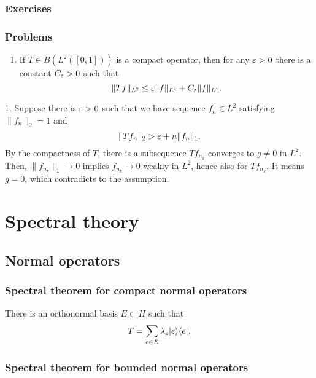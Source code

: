 \documentclass{../note}
\begin{document}
\section*{Exercises}

\section*{Problems}
\begin{enumerate}
\item If $T\in B(L^2([0,1]))$ is a compact operator, then for any $\varepsilon>0$ there is a constant $C_\varepsilon>0$ such that
\[\|Tf\|_{L^2}\le\varepsilon\|f\|_{L^2}+C_\varepsilon\|f\|_{L^1}.\]
\end{enumerate}

\begin{pf}
1. Suppose there is $\varepsilon>0$ such that we have sequence $f_n\in L^2$ satisfying $\|f_n\|_2=1$ and
\[\|Tf_n\|_2>\varepsilon+n\|f_n\|_1.\]
By the compactness of $T$, there is a subsequence $Tf_{n_k}$ converges to $g\ne0$ in $L^2$.
Then, $\|f_{n_k}\|_1\to0$ implies $f_{n_k}\to0$ weakly in $L^2$, hence also for $Tf_{n_k}$.
It means $g=0$, which contradicts to the assumption.
\end{pf}







\part{Spectral theory}
\chapter{}



\chapter{Normal operators}
\section{Spectral theorem for compact normal operators}
There is an orthonormal basis $E\subset H$ such that
\[T=\sum_{e\in E}\lambda_e|e\rangle\langle e|.\]

\section{Spectral theorem for bounded normal operators}
\end{document}
